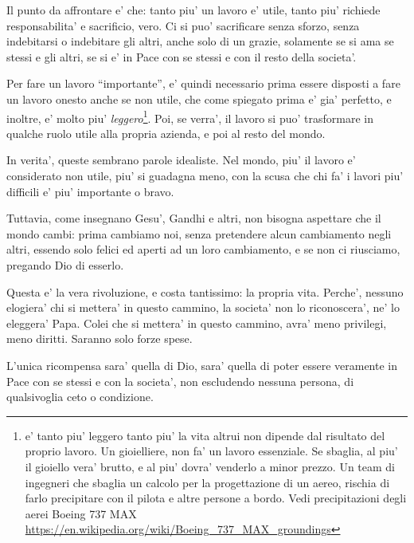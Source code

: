 Il punto da affrontare e' che: tanto piu' un lavoro e' utile, tanto piu' richiede responsabilita' e sacrificio, vero. Ci si puo' sacrificare senza sforzo, senza indebitarsi o indebitare gli altri, anche solo di un grazie, solamente se si ama se stessi e gli altri, se si e' in Pace con se stessi e con il resto della societa'.

Per fare un lavoro ``importante'', e' quindi necessario prima essere disposti a fare un lavoro onesto anche se non utile, che come spiegato prima e' gia' perfetto, e inoltre, e' molto piu' \emph{leggero}\footnote{e' tanto piu' leggero tanto piu' la vita altrui non dipende dal risultato del proprio lavoro. Un gioielliere, non fa' un lavoro essenziale. Se sbaglia, al piu' il gioiello vera' brutto, e al piu' dovra' venderlo a minor prezzo. Un team di ingegneri che sbaglia un calcolo per la progettazione di un aereo, rischia di farlo precipitare con il pilota e altre persone a bordo. Vedi precipitazioni degli aerei Boeing 737 MAX \url{https://en.wikipedia.org/wiki/Boeing\_737\_MAX\_groundings}}. 
Poi, se verra', il lavoro si puo' trasformare in qualche ruolo utile alla propria azienda, e poi al resto del mondo.

In verita', queste sembrano parole idealiste. Nel mondo, piu' il lavoro e' considerato non utile, piu' si guadagna meno, con la scusa che chi fa' i lavori piu' difficili e' piu' importante o bravo.

Tuttavia, come insegnano Gesu', Gandhi e altri, non bisogna aspettare che il mondo cambi: prima cambiamo noi, senza pretendere alcun cambiamento negli altri, essendo solo felici ed aperti ad un loro cambiamento, e se non ci riusciamo, pregando Dio di esserlo.

Questa e' la vera rivoluzione, e costa tantissimo: la propria vita. Perche', nessuno elogiera' chi si mettera' in questo cammino, la societa' non lo riconoscera', ne' lo eleggera' Papa. Colei che si mettera' in questo cammino, avra' meno privilegi, meno diritti. Saranno solo forze spese. 

L'unica ricompensa sara' quella di Dio, sara' quella di poter essere veramente in Pace con se stessi e con la societa', non escludendo nessuna persona, di qualsivoglia ceto o condizione.

